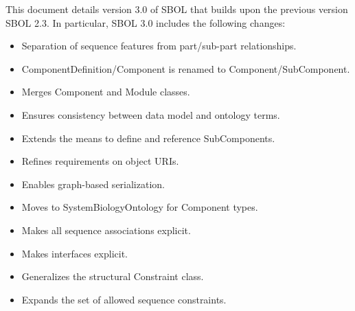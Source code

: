 This document details version 3.0 of SBOL that builds upon the previous version SBOL 2.3.  In particular, SBOL 3.0 includes the following changes:
\begin{itemize}
\item Separation of sequence features from part/sub-part relationships.
\item ComponentDefinition/Component is renamed to Component/SubComponent.
\item Merges Component and Module classes.
\item Ensures consistency between data model and ontology terms.
\item Extends the means to define and reference SubComponents.
\item Refines requirements on object URIs.
\item Enables graph-based serialization.
\item Moves to SystemBiologyOntology for Component types.
\item Makes all sequence associations explicit.
\item Makes interfaces explicit.
\item Generalizes the structural Constraint class.
\item Expands the set of allowed sequence constraints.
\end{itemize}



